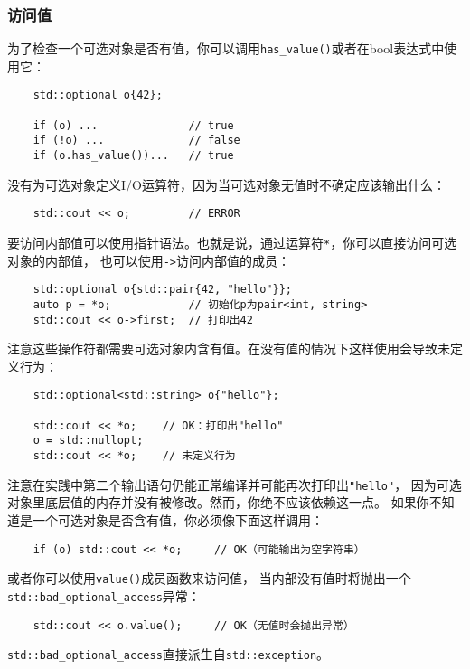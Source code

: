 \subsubsection{访问值}
为了检查一个可选对象是否有值，你可以调用\texttt{has\_value()}或者在bool表达式中使用它：
\begin{lstlisting}
    std::optional o{42};

    if (o) ...              // true
    if (!o) ...             // false
    if (o.has_value())...   // true
\end{lstlisting}
没有为可选对象定义I/O运算符，因为当可选对象无值时不确定应该输出什么：
\begin{lstlisting}
    std::cout << o;         // ERROR
\end{lstlisting}
要访问内部值可以使用指针语法。也就是说，通过运算符\texttt{*}，你可以直接访问可选对象的内部值，
也可以使用\texttt{->}访问内部值的成员：
\begin{lstlisting}
    std::optional o{std::pair{42, "hello"}};
    auto p = *o;            // 初始化p为pair<int, string>
    std::cout << o->first;  // 打印出42
\end{lstlisting}
注意这些操作符都需要可选对象内含有值。在没有值的情况下这样使用会导致未定义行为：
\begin{lstlisting}
    std::optional<std::string> o{"hello"};

    std::cout << *o;    // OK：打印出"hello"
    o = std::nullopt;
    std::cout << *o;    // 未定义行为
\end{lstlisting}
注意在实践中第二个输出语句仍能正常编译并可能再次打印出\texttt{"hello"}，
因为可选对象里底层值的内存并没有被修改。然而，你绝不应该依赖这一点。
如果你不知道是一个可选对象是否含有值，你必须像下面这样调用：
\begin{lstlisting}
    if (o) std::cout << *o;     // OK（可能输出为空字符串）
\end{lstlisting}
或者你可以使用\texttt{value()}成员函数来访问值，
当内部没有值时将抛出一个\texttt{std::bad\_optional\_access}异常：
\begin{lstlisting}
    std::cout << o.value();     // OK（无值时会抛出异常）
\end{lstlisting}
\texttt{std::bad\_optional\_access}直接派生自\texttt{std::exception}。

